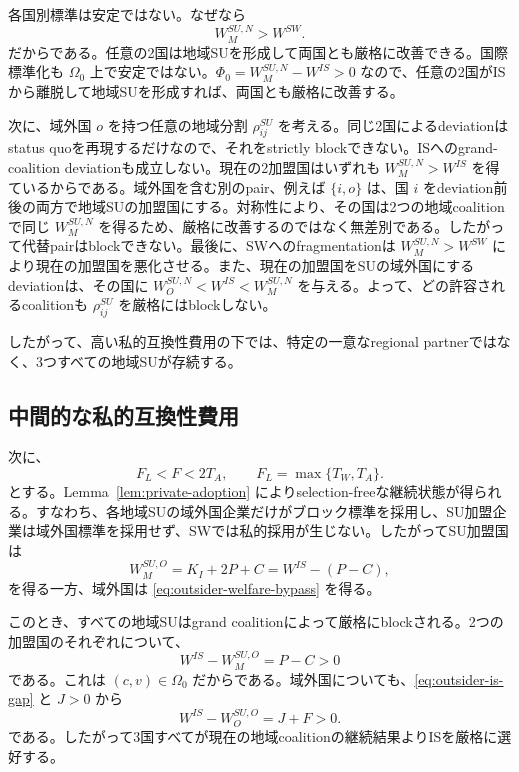 各国別標準は安定ではない。なぜなら
\[
    W_M^{SU,N}>W^{SW}.
\]
だからである。任意の2国は地域SUを形成して両国とも厳格に改善できる。国際標準化も $\Omega_0$ 上で安定ではない。$\Phi_0=W_M^{SU,N}-W^{IS}>0$ なので、任意の2国がISから離脱して地域SUを形成すれば、両国とも厳格に改善する。

次に、域外国 $o$ を持つ任意の地域分割 $\rho_{ij}^{SU}$ を考える。同じ2国によるdeviationはstatus quoを再現するだけなので、それをstrictly blockできない。ISへのgrand-coalition deviationも成立しない。現在の2加盟国はいずれも $W_M^{SU,N}>W^{IS}$ を得ているからである。域外国を含む別のpair、例えば $\{i,o\}$ は、国 $i$ をdeviation前後の両方で地域SUの加盟国にする。対称性により、その国は2つの地域coalitionで同じ $W_M^{SU,N}$ を得るため、厳格に改善するのではなく無差別である。したがって代替pairはblockできない。最後に、SWへのfragmentationは $W_M^{SU,N}>W^{SW}$ により現在の加盟国を悪化させる。また、現在の加盟国をSUの域外国にするdeviationは、その国に $W_O^{SU,N}<W^{IS}<W_M^{SU,N}$ を与える。よって、どの許容されるcoalitionも $\rho_{ij}^{SU}$ を厳格にはblockしない。

したがって、高い私的互換性費用の下では、特定の一意なregional partnerではなく、3つすべての地域SUが存続する。

\subsection{中間的な私的互換性費用}
\label{subsec:intermediate-f-stability}

次に、
\begin{equation}
    F_L<F<2T_A,
    \qquad F_L=\max\{T_W,T_A\}.
    \label{eq:intermediate-f-region-stability}
\end{equation}
とする。Lemma~\ref{lem:private-adoption} によりselection-freeな継続状態が得られる。すなわち、各地域SUの域外国企業だけがブロック標準を採用し、SU加盟企業は域外国標準を採用せず、SWでは私的採用が生じない。したがってSU加盟国は
\begin{equation}
    W_M^{SU,O}=K_I+2P+C
    =W^{IS}-(P-C),
    \label{eq:member-intermediate-welfare}
\end{equation}
を得る一方、域外国は \eqref{eq:outsider-welfare-bypass} を得る。

このとき、すべての地域SUはgrand coalitionによって厳格にblockされる。2つの加盟国のそれぞれについて、
\[
    W^{IS}-W_M^{SU,O}=P-C>0
\]
である。これは $(c,v)\in\Omega_0$ だからである。域外国についても、\eqref{eq:outsider-is-gap} と $J>0$ から
\[
    W^{IS}-W_O^{SU,O}=J+F>0.
\]
である。したがって3国すべてが現在の地域coalitionの継続結果よりISを厳格に選好する。

